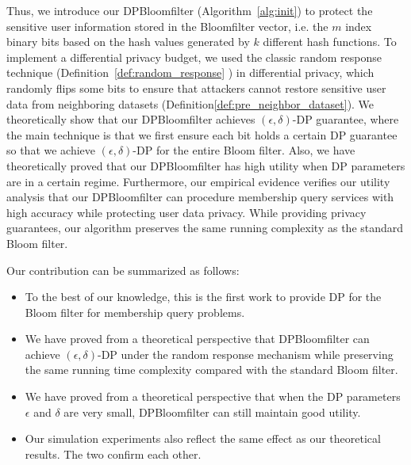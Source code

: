 Thus, we introduce our DPBloomfilter (Algorithm~\ref{alg:init}) to protect the sensitive user information stored in the Bloomfilter vector, i.e. the $m$ index binary bits based on the hash values generated by $k$ different hash functions.
To implement a differential privacy budget, we used the classic random response technique \cite{w65} (Definition~\ref{def:random_response}
) in differential privacy, which randomly flips some bits to ensure that attackers cannot restore sensitive user data from neighboring datasets (Definition\ref{def:pre_neighbor_dataset}).
We theoretically show that our DPBloomfilter achieves $(\epsilon, \delta)$-DP guarantee, where the main technique is that we first ensure each bit holds a certain DP guarantee so that we achieve $(\epsilon, \delta)$-DP for the entire Bloom filter. 
Also, we have theoretically proved that our DPBloomfilter has high utility when  DP parameters are in a certain regime.
Furthermore, our empirical evidence verifies our utility analysis that our DPBloomfilter can procedure membership query services with high accuracy while protecting user data privacy.
While providing privacy guarantees, our algorithm preserves the same running complexity as the standard Bloom filter. 

Our contribution can be summarized as follows:
\begin{itemize}
    \item  To the best of our knowledge, this is the first work to provide DP for the Bloom filter for membership query problems.
    \item We have proved from a theoretical perspective that DPBloomfilter can achieve $(\epsilon, \delta)$-DP under the random response mechanism while preserving the same running time complexity compared with the standard Bloom filter.  
    \item We have proved from a theoretical perspective that when the DP parameters $\epsilon$ and $\delta$ are very small, DPBloomfilter can still maintain good utility. 
    \item Our simulation experiments also reflect the same effect as our theoretical results. The two confirm each other. 
\end{itemize}

